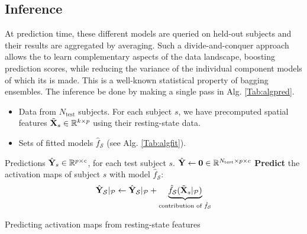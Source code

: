 \subsection{Inference}
At prediction time, these different models are queried on held-out subjects and their results are
  aggregated by averaging. Such a divide-and-conquer approach allows the to learn
  complementary aspects of the data landscape, boosting prediction scores, while reducing the
  variance of the individual
  component models of which its is made. 
%
  This is a well-known statistical property of bagging
  ensembles. The inference be done by making a single pass in Alg. \ref{Tab:algpred}.


\begin{algorithm}
  \begin{algorithmic}[1]
    \Require
    \begin{itemize}
    \item Data from $N_{\text{test}}$ subjects. For each subject $s$, we have
      precomputed spatial features $\tilde{\mathbf{X}}_s \in \mathbb R^{k \times p}$ using their resting-state
      data.
    \item 
       Sets of fitted models $\hat{f}_{\mathcal S}$ (see Alg. \ref{Tab:algfit}).
     \end{itemize}
    \Ensure Predictions $\hat{\mathbf{Y}}_s \in \mathbb R^{p \times c}$, for each test subject $s$.
  \State $\hat{\mathbf{Y}} \leftarrow \boldsymbol{0} \in \mathbb R^{N_{\text{test}} \times p \times c}$
  \State \textbf{Predict} the activation maps of subject $s$ with model $\hat{f}_{\mathcal S}$:
  $$\hat{\mathbf{Y}}_{\mathcal S}|_{\mathcal P} \leftarrow \hat{\mathbf{Y}}_{\mathcal S}|_{\mathcal P} +
  \underbrace{\hat{f}_{\mathcal S}(\tilde{\mathbf{X}}_s|_{\mathcal P})}_{\text{contribution of } \hat{f}_{\mathcal S}}$$
  \EndParFor
  \EndParFor
  \EndParFor
\end{algorithmic}
\caption{Predicting activation maps from resting-state features}
\label{Tab:algpred}
\end{algorithm}

